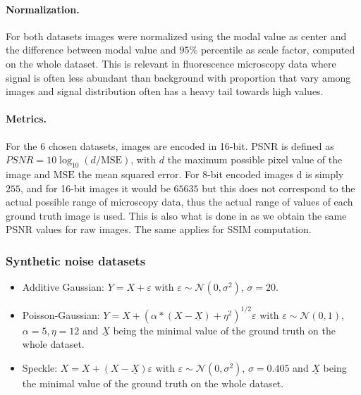 \documentclass{article}
\begin{document}
\paragraph{Normalization.}

For both datasets images were normalized using the modal value as center and the difference between modal value and $95\%$ percentile as scale factor, computed on the whole dataset.
This is relevant in fluorescence microscopy data where signal is often less abundant than background with proportion that vary among images and signal distribution often has a heavy tail towards high values.

\paragraph{Metrics.}
For the 6 chosen datasets, images are encoded in 16-bit.
PSNR is defined as $PSNR = 10 \log_{10}(d/\mathrm{MSE})$, with $d$ the maximum possible pixel value of the image and $\mathrm{MSE}$ the mean squared error.
For 8-bit encoded images d is simply $255$, and for 16-bit images it would be $65635$ but this does not correspond to the actual possible range of microscopy data, thus the actual range of values of each ground truth image is used. This is also what is done in \cite{goncharova2020} as we obtain the same PSNR values for raw images.
The same applies for SSIM computation.

\subsubsection{Synthetic noise datasets}
\label{si:synthetic}
\begin{itemize}
  \item Additive Gaussian: $Y = X + \varepsilon$ with $\varepsilon \sim \mathcal{N}(0, \sigma^2)$, $\sigma=20$.
  \item Poisson-Gaussian: $Y = X + (\alpha * (X-\underline{X}) + \eta^2 )^{1/2}\varepsilon$  with $\varepsilon \sim \mathcal{N}(0, 1)$, $\alpha=5, \eta=12$ and $\underline{X}$ being the minimal value of the ground truth on the whole dataset.
  \item Speckle: $X = X + (X-\underline{X})\varepsilon$  with $\varepsilon \sim \mathcal{N}(0, \sigma^2)$, $\sigma=0.405$ and $\underline{X}$ being the minimal value of the ground truth on the whole dataset.
\end{itemize}
\end{document}
